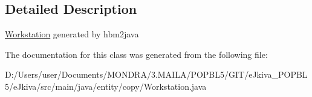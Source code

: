 \subsection{Detailed Description}
\mbox{\hyperlink{classentity_1_1copy_1_1_workstation}{Workstation}} generated by hbm2java 

The documentation for this class was generated from the following file\+:\begin{DoxyCompactItemize}
\item 
D\+:/\+Users/user/\+Documents/\+M\+O\+N\+D\+R\+A/3.\+M\+A\+I\+L\+A/\+P\+O\+P\+B\+L5/\+G\+I\+T/e\+Jkiva\+\_\+\+P\+O\+P\+B\+L5/e\+Jkiva/src/main/java/entity/copy/Workstation.\+java\end{DoxyCompactItemize}
